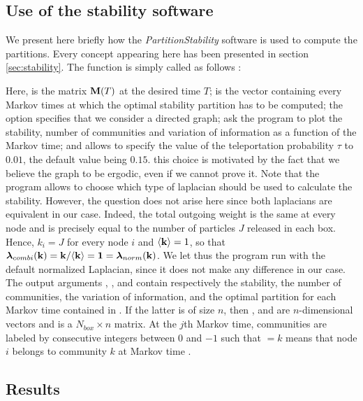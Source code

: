 \subsection{Use of the stability software}
We present here briefly how the \textit{PartitionStability} software is used to compute the partitions. Every concept appearing here has been presented in section \ref{sec:stability}. The  function is simply called as follows : \vspace{-.2cm}
\begin{center}
\end{center} %
Here,  is the matrix $\mathbf M(T)$ at the desired time $T$;  is the vector containing every Markov times at which the optimal stability partition has to be computed; the  option specifies that we consider a directed graph;  ask the program to plot the stability, number of communities and variation of information as a function of the Markov time; and  allows to specify the value of the teleportation probability $\tau$ to $0.01$, the default value being $0.15$. this choice is motivated by the fact that we believe the graph to be ergodic, even if we cannot prove it. Note that the program allows to choose which type of laplacian should be used to calculate the stability. However, the question does not arise here since both laplacians are equivalent in our case. Indeed, the total outgoing weight is the same at every node and is precisely equal to the number of particles $J$ released in each box. Hence, $k_i = J$ for every node $i$ and $\langle \mathbf k \rangle = 1$, so that $\boldsymbol \lambda_{combi}(\mathbf k) = \mathbf k/ \langle \mathbf k \rangle = \mathbf 1 = \boldsymbol \lambda_{norm}(\mathbf k)$. We let thus the program run with the default normalized Laplacian, since it does not make any difference in our case. The output arguments , ,  and  contain respectively the stability, the number of communities, the variation of information, and the optimal partition for each Markov time contained in . If the latter is of size $n$, then ,  and  are $n$-dimensional vectors and  is a $N_{box} \times n$ matrix. At the $j$th Markov time, communities are labeled by consecutive integers between $0$ and $-1$ such that  $= k$ means that node $i$ belongs to community $k$ at Markov time .  



\subsection{Results}
